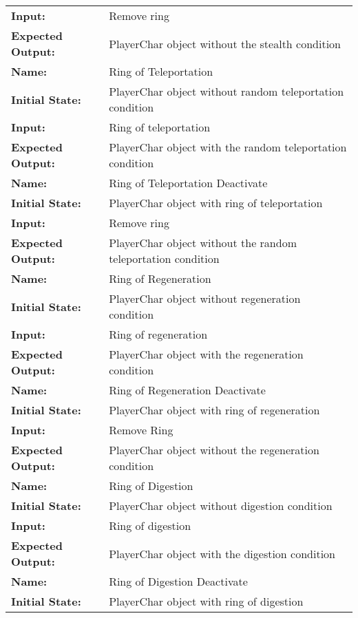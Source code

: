 \documentclass[12pt, titlepage]{article}
\begin{document}
\begin{center}
\begin{longtable}{ l | p{10cm} }
				\textbf{Input:} & Remove ring\\
				\textbf{Expected Output:} & PlayerChar object without the stealth condition\\[0.6em]
				\hline
				\rule{0pt}{1.5em}\textbf{Name:} & Ring of Teleportation\\
				\textbf{Initial State:} & PlayerChar object without random teleportation condition\\
				\textbf{Input:} & Ring of teleportation\\
				\textbf{Expected Output:} & PlayerChar object with the random teleportation condition\\[0.6em]
				\hline
				\rule{0pt}{1.5em}\textbf{Name:} & Ring of Teleportation Deactivate\\
				\textbf{Initial State:} & PlayerChar object with ring of teleportation\\
				\textbf{Input:} & Remove ring\\
				\textbf{Expected Output:} & PlayerChar object without the random teleportation condition\\[0.6em]
				\hline
				\rule{0pt}{1.5em}\textbf{Name:} & Ring of Regeneration\\
				\textbf{Initial State:} & PlayerChar object without regeneration condition\\
				\textbf{Input:} & Ring of regeneration\\
				\textbf{Expected Output:} & PlayerChar object with the regeneration condition\\[0.6em]
				\hline
				\rule{0pt}{1.5em}\textbf{Name:} & Ring of Regeneration Deactivate\\
				\textbf{Initial State:} & PlayerChar object with ring of regeneration\\
				\textbf{Input:} & Remove Ring\\
				\textbf{Expected Output:} & PlayerChar object without the regeneration condition\\[0.6em]
				\hline
				\rule{0pt}{1.5em}\textbf{Name:} & Ring of Digestion\\
				\textbf{Initial State:} & PlayerChar object without digestion condition\\
				\textbf{Input:} & Ring of digestion\\
				\textbf{Expected Output:} & PlayerChar object with the digestion condition\\[0.6em]
				\hline
				\rule{0pt}{1.5em}\textbf{Name:} & Ring of Digestion Deactivate\\
				\textbf{Initial State:} & PlayerChar object with ring of digestion\\

\end{longtable}
\end{center}
\end{document}
